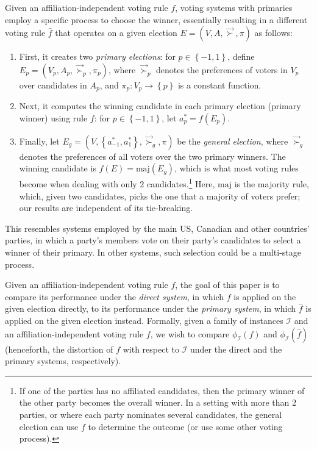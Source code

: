 \documentclass[letterpaper]{article} %
\theoremstyle{definition}
\newcommand{\set}[1]{\left\{#1\right\}}
\renewcommand{\vec}{\overrightarrow}
\renewcommand{\hat}{\widehat}
\newcommand{\calI}{\mathcal{I}}
\newcommand{\vsucc}{\vec{\succ}}
\newcommand{\pleft}{-1}
\newcommand{\pright}{1}
\newcommand{\maj}{\textrm{maj}}
\begin{document}
Given an affiliation-independent voting rule $f$, voting systems with primaries employ a specific process to choose the winner, essentially resulting in a different voting rule $\hat{f}$ that operates on a given election $E = (V,A,\vsucc,\pi)$ as follows:
\begin{enumerate}
	\item First, it creates two \emph{primary elections}: for $p \in \set{\pleft,\pright}$, define $E_p = (V_p,A_p,\vsucc_p,\pi_p)$, where $\vsucc_p$ denotes the preferences of voters in $V_p$ over candidates in $A_p$, and $\pi_p : V_p \to \set{p}$ is a constant function.
	\item Next, it computes the winning candidate in each primary election (primary winner) using rule $f$: for $p \in \set{\pleft,\pright}$, let $a^*_p = f(E_p)$.
	\item Finally, let $E_g = (V,\set{a^*_{\pleft},a^*_{\pright}},\vsucc_g,\pi)$ be the \emph{general election}, where $\vsucc_g$ denotes the preferences of all voters over the two primary winners. The winning candidate is $\hat{f}(E) = \maj(E_g)$, which is what most voting rules become when dealing with only 2 candidates.\footnote{If one of the parties has no affiliated candidates, then the primary winner of the other party becomes the overall winner. In a setting with more than 2 parties, or where each party nominates several candidates, the general election can use $f$ to determine the outcome (or use some other voting process).} Here, $\maj$ is the majority rule, which, given two candidates, picks the one that a majority of voters prefer; our results are independent of its tie-breaking.
\end{enumerate}
This resembles systems employed by the main US, Canadian and other countries' parties, in which a party's members vote on their party's candidates to select a winner of their primary. In other systems, such selection could be a multi-stage process.

Given an affiliation-independent voting rule $f$, the goal of this paper is to compare its performance under the \emph{direct system}, in which $f$ is applied on the given election directly, to its performance under the \emph{primary system}, in which $\hat{f}$ is applied on the given election instead. Formally, given a family of instances $\calI$ and an affiliation-independent voting rule $f$, we wish to compare $\phi_{\calI}(f)$ and $\phi_{\calI}(\hat{f})$ (henceforth, the distortion of $f$ with respect to $\calI$ under the direct and the primary systems, respectively).
\end{document}
